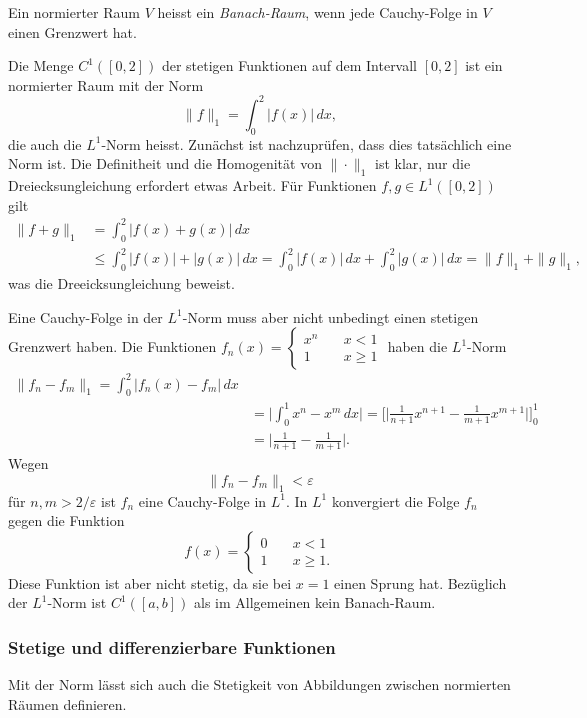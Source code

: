 \begin{definition}
Ein normierter Raum $V$ heisst ein {\em Banach-Raum},
%
wenn jede Cauchy-Folge in $V$ einen Grenzwert hat.
\end{definition}

\begin{beispiel}
Die Menge $C^1([0,2])$
der stetigen Funktionen auf dem Intervall $[0,2]$ ist ein normierter
Raum mit der Norm
\[
\|f\|_1
=
\int_0^2 |f(x)|\,dx,
\]
die auch die $L^1$-Norm heisst.
%
Zunächst ist nachzuprüfen, dass dies tatsächlich eine Norm ist.
Die Definitheit und die Homogenität von $\|\cdot\|_1$ ist klar, nur
die Dreiecksungleichung erfordert etwas Arbeit.
Für Funktionen $f,g\in L^1([0,2])$ gilt
\begin{align*}
\|f+g\|_1
&=
\int_0^2 |f(x)+g(x)|\,dx
\\
&\le 
\int_0^2 |f(x)|+|g(x)|\,dx
=
\int_0^2 |f(x)|\,dx
+
\int_0^2 |g(x)|\,dx
=
\|f\|_1+\|g\|_1,
\end{align*}
was die Dreeicksungleichung beweist.

Eine Cauchy-Folge in der $L^1$-Norm muss aber nicht unbedingt einen
stetigen Grenzwert haben.
Die Funktionen
\(
f_n(x) =
\begin{cases}
x^n&\quad x< 1\\
1&\quad x\ge 1
\end{cases}
\)
haben die $L^1$-Norm
\begin{align*}
\|f_n-f_m\|_1
=
\int_0^2 |f_n(x)-f_m|\,dx
\\
&=
\biggl|\int_0^1 x^n-x^m\,dx\biggr|
=
\biggl[
\biggl|
\frac{1}{n+1}x^{n+1}
-
\frac{1}{m+1}x^{m+1}
\biggr|
\biggr]_0^1
\\
&=
\biggl|
\frac{1}{n+1}
-
\frac{1}{m+1}\biggr|.
\end{align*}
Wegen
\[
\|f_n-f_m\|_1
<\varepsilon
\]
für $n,m>2/\varepsilon$ ist $f_n$ eine Cauchy-Folge in $L^1$.
In $L^1$ konvergiert die Folge $f_n$ gegen die Funktion
\[
f(x)
=
\begin{cases}
0&\quad x< 1\\
1&\quad x\ge 1.
\end{cases}
\]
Diese Funktion ist aber nicht stetig, da sie bei $x=1$ einen
Sprung hat.
Bezüglich der $L^1$-Norm ist $C^1([a,b])$ als im Allgemeinen
kein Banach-Raum.
\end{beispiel}

%
%
\subsubsection{Stetige und differenzierbare Funktionen}
Mit der Norm lässt sich auch die Stetigkeit von Abbildungen zwischen
normierten Räumen definieren.

